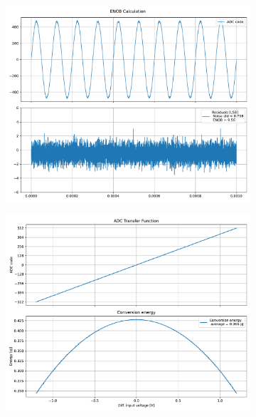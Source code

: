\documentclass[varwidth]{standalone}
\begin{document}
\begin{figure}
\begin{subfigure}{0.32\textwidth}
    \includegraphics[width=\textwidth]{behavioral_10b_devnoise_enob.pdf}
\end{subfigure}
\begin{subfigure}{0.32\textwidth}
    \begin{table}
    \let\center\empty
    \let\endcenter\relax
    \centering
    \resizebox{0.3\width}{!}{}
    \end{table}
    \includegraphics[width=\textwidth]{behavioral_10b_devnoise_energy.pdf}
\end{subfigure}
\end{figure}
\end{document}
